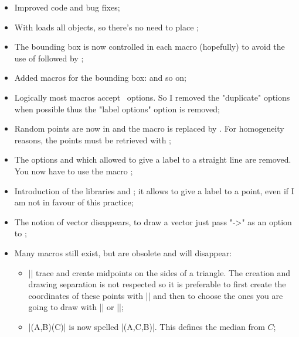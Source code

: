  \begin{itemize}\setlength{\itemsep}{10pt} 

\item Improved code and bug fixes;

\item With  loads all objects, so there's no need to place ;\item The bounding box is now controlled in each macro (hopefully) to avoid the use of  followed by ;\item Added macros for the bounding box:   and so on;\item  Logically most macros accept \TIKZ\ options. So I removed the "duplicate" options when possible thus the "label options" option is removed;

\item Random points are now in \tkzname{\tkznameofpack} and the macro  is replaced by . For homogeneity reasons, the points must be retrieved with ;

\item The options  and  which allowed to give a label to a straight  line are removed. You now have to use the macro ;

\item Introduction of the libraries  and ; it allows to give a label to a point, even if I am not in favour of this practice;

\item  The notion of vector disappears, to draw a vector just pass "->" as an option to ;

\item Many macros still exist, but are obsolete and will disappear:
\begin{itemize}

\item |\tkzDrawMedians| trace and create midpoints on the sides of a triangle. The creation and drawing separation is not respected so it is preferable to first create the coordinates of these points with |\tkzSpcTriangle[median]| and then to choose the ones you are going to draw with |\tkzDrawSegments| or |\tkzDrawLines|;

\item |\tkzDrawMedians(A,B)(C)| is now spelled |\tkzDrawMedians(A,C,B)|. This defines the median from $C$;
  

\end{itemize}
\end{itemize}
